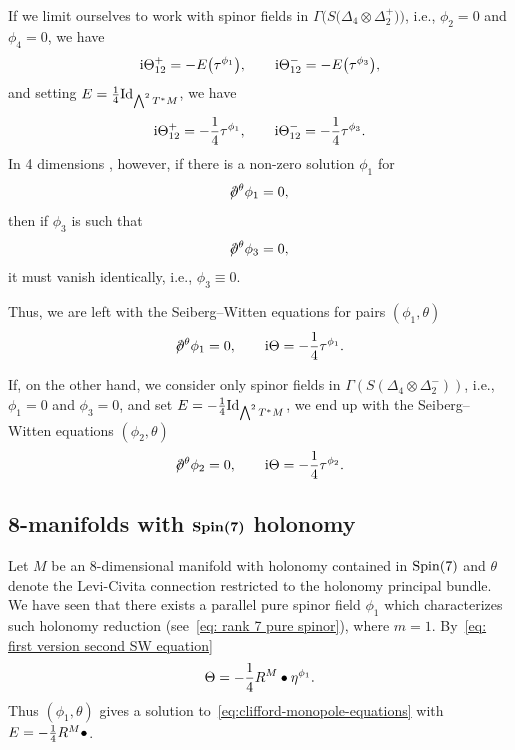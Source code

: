 \documentclass[10pt,a4paper]{amsart}
\newcommand{\dirac}{/\kern-5pt\partial}
\numberwithin{equation}{section}
\begin{document}
If we limit ourselves to work with spinor fields in $\Gamma\big(S\big(\Delta_4\otimes\Delta_2^+\big)\big)$, i.e., $\phi_2=0$ and $\phi_4=0$, we have
\begin{gather*}
{\rm i}\Theta_{12}^+ = -E\big(\tau^{\phi_1}\big),\qquad
{\rm i}\Theta_{12}^- = -E\big(\tau^{\phi_3}\big),
\end{gather*}
and setting $E={1\over 4}{\rm Id}_{\bigwedge^2T^*M}$, we have
\begin{gather*}
{\rm i}\Theta_{12}^+ = -{1\over 4}\tau^{\phi_1},\qquad
{\rm i}\Theta_{12}^- = -{1\over 4}\tau^{\phi_3}.
\end{gather*}
In 4 dimensions \cite{Morgan}, however, if there is a non-zero solution $\phi_1$ for
\begin{gather*}\dirac^\theta\phi_1=0,\end{gather*}
then if $\phi_3$ is such that
\begin{gather*}\dirac^\theta\phi_3=0,\end{gather*}
it must vanish identically, i.e., $\phi_3\equiv0$.

Thus, we are left with the Seiberg--Witten equations for pairs $(\phi_1,\theta)$~\cite{Friedrich}
\begin{gather*}
\dirac^\theta \phi_1 = 0,\qquad
{\rm i}\Theta = -{1\over 4}\tau^{\phi_1}.
\end{gather*}

If, on the other hand, we consider only spinor fields in $\Gamma(S(\Delta_4\otimes\Delta_2^-))$, i.e., $\phi_1=0$ and $\phi_3=0$, and set $E=-{1\over 4}{\rm Id}_{\bigwedge^2T^*M}$, we end up with the Seiberg--Witten equations $(\phi_2,\theta)$
\begin{gather*}
\dirac^\theta \phi_2 = 0,\qquad
{\rm i}\Theta = -{1\over 4}\tau^{\phi_2}.
\end{gather*}

\subsection[8-manifolds with ${\rm Spin}(7)$ holonomy]{8-manifolds with $\boldsymbol{{\rm Spin}(7)}$ holonomy}

Let $M$ be an $8$-dimensional manifold with holonomy contained in ${\rm Spin}(7)$ and $\theta$ denote the Levi-Civita connection restricted to the holonomy principal bundle. We have seen that there exists a parallel pure spinor field $\phi_1$ which characterizes such holonomy reduction (see~\eqref{eq: rank 7 pure spinor}), where $m=1$. By~\eqref{eq: first version second SW equation}
\begin{gather*}
\Theta = -{1\over 4}R^M\bullet\eta^{\phi_1}.
\end{gather*}
Thus $(\phi_1,\theta)$ gives a solution to~\eqref{eq:clifford-monopole-equations} with $E=-{1\over 4}R^M\bullet$.
\end{document}

